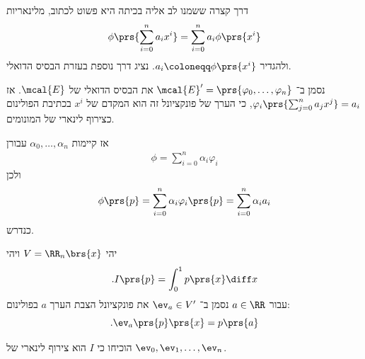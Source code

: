 \documentclass[a4paper,10pt,twoside,openany]{book}
\begin{document}
\begin{solution}
דרך קצרה ששמנו לב אליה בכיתה היא פשוט לכתוב, מלינאריות
\begin{align*}
\phi\prs{\sum_{i=0}^n a_i x^i} = \sum_{i=0}^n a_i \phi\prs{x^i}
\end{align*}
ולהגדיר
$a_i \coloneqq \phi\prs{x^i}$.
נציג דרך נוספת בעזרת הבסיס הדואלי.

נסמן ב־%
$\mcal{E}' = \prs{\varphi_0, \ldots, \varphi_n}$
את הבסיס הדואלי של
$\mcal{E}$.
אז
$\varphi_i\prs{\sum_{j=0}^n a_j x^j} = a_i$,
כי הערך של פונקציונל זה הוא המקדם של
$x^i$
בכתיבת הפולינום כצירוף לינארי של המונומים.

אז קיימות
$\alpha_0, \ldots, \alpha_n$
עבורן
\begin{align*}
\phi = \sum_{i=0}^n \alpha_i \varphi_i
\end{align*}
ולכן
\begin{align*}
\phi\prs{p} = \sum_{i=0}^n \alpha_i \varphi_i\prs{p} = \sum_{i=0}^n \alpha_i a_i
\end{align*}
כנדרש.
\end{solution}

\begin{exercisechap}
יהי
$V = \RR_n\brs{x}$
ויהי
\[\text{.} I\prs{p} = \int_0^1 p\prs{x} \diff x\]
עבור
$a \in \RR$
נסמן ב־%
$\ev_a \in V'$
את פונקציונל הצבת הערך
$a$
בפולינום:
\[\text{.} \ev_a\prs{p}\prs{x} = p\prs{a}\]

הוכיחו כי
$I$
הוא צירוף לינארי של
$\ev_0, \ev_1, \ldots, \ev_n$.
\end{exercisechap}
\end{document}
